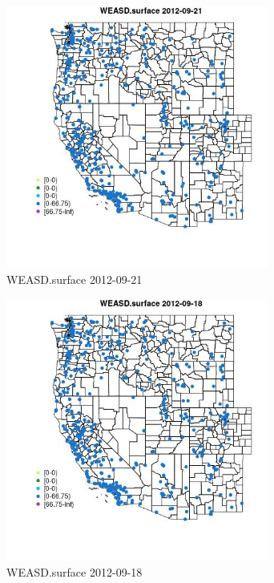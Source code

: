 \begin{figure} 
\centering  
\includegraphics[width=0.77\textwidth]{Code_Outputs/Report_ML_input_PM25_Step4_part_e_de_duplicated_aves_compiled_2019-05-14wNAs_MapObsWEASDsurface2012-09-21.jpg} 
\caption{\label{fig:Report_ML_input_PM25_Step4_part_e_de_duplicated_aves_compiled_2019-05-14wNAsMapObsWEASDsurface2012-09-21}WEASD.surface 2012-09-21} 
\end{figure} 
 

\begin{figure} 
\centering  
\includegraphics[width=0.77\textwidth]{Code_Outputs/Report_ML_input_PM25_Step4_part_e_de_duplicated_aves_compiled_2019-05-14wNAs_MapObsWEASDsurface2012-09-18.jpg} 
\caption{\label{fig:Report_ML_input_PM25_Step4_part_e_de_duplicated_aves_compiled_2019-05-14wNAsMapObsWEASDsurface2012-09-18}WEASD.surface 2012-09-18} 
\end{figure} 
 

